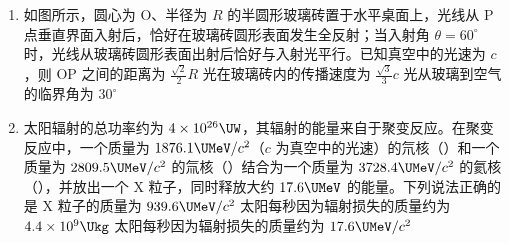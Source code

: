 \documentclass[\gkver]{gaokaozhenti}
\begin{document}
\begin{enumerate}
{B．电容器两极板间电压等于电源电动势 $E$，带电微粒在两极板间处于静止状态，则 $q\frac{E}{d}=mg$，即 $\frac{q}{m}=\frac{dg}{E}=\frac{dg}{\frac{1}{2}Br^{2}\omega}=\frac{2dg}{Br^{2}\omega}$，B 正确；

C．电阻消耗的功率 $P=\frac{E^{2}}{R}=\frac{B^{2}r^{4}\omega^{2}}{4R}$，C 错误；

D．电容器所带的电荷量 $Q=CE=\frac{CBr^{2}\omega}{2}$，D 错误。

故选 B。
}

\item
如图所示，圆心为 O、半径为 $R$ 的半圆形玻璃砖置于水平桌面上，光线从 P 点垂直界面入射后，恰好在玻璃砖圆形表面发生全反射；当入射角 $\theta=60^\circ$ 时，光线从玻璃砖圆形表面出射后恰好与入射光平行。已知真空中的光速为 $c$，则
\onepicture[w=5.0cm]{}
{OP 之间的距离为 $\frac{\sqrt{2}}{2}R$}
{光在玻璃砖内的传播速度为 $\frac{\sqrt{3}}{3}c$}
{光从玻璃到空气的临界角为 $30^\circ$}

\item
太阳辐射的总功率约为 $4\times10^{26}\UW$，其辐射的能量来自于聚变反应。在聚变反应中，一个质量为 $1876.1\UMeV/c^{2}$（$c$ 为真空中的光速）的氘核（）和一个质量为 $2809.5\UMeV/c^{2}$ 的氚核（）结合为一个质量为 $3728.4\UMeV/c^{2}$ 的氦核（），并放出一个 X 粒子，同时释放大约 $17.6\UMeV$ 的能量。下列说法正确的是
{X 粒子的质量为 $939.6\UMeV/c^{2}$}
{太阳每秒因为辐射损失的质量约为 $4.4\times10^{9}\Ukg$}
{太阳每秒因为辐射损失的质量约为 $17.6\UMeV/c^{2}$}
\end{enumerate}
\end{document}
